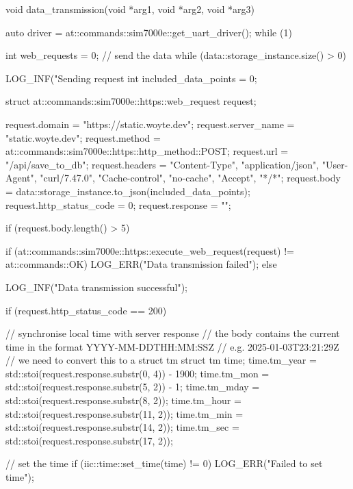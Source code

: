 \begin{cpp}[caption={Implementation of the data transmission thread}]
void data_transmission(void *arg1, void *arg2, void *arg3)
{
    auto driver = at::commands::sim7000e::get_uart_driver();
    while (1)
    {
        int web_requests = 0;
        // send the data
        while (data::storage_instance.size() > 0)
        {
            LOG_INF("Sending request %
            int included_data_points = 0;

            struct at::commands::sim7000e::https::web_request request;

            request.domain = "https://static.woyte.dev";
            request.server_name = "static.woyte.dev";
            request.method = at::commands::sim7000e::https::http_method::POST;
            request.url = "/api/save_to_db";
            request.headers = {{"Content-Type", "application/json"}, {"User-Agent", "curl/7.47.0"}, {"Cache-control", "no-cache"}, {"Accept", "*/*"}};
            request.body = data::storage_instance.to_json(included_data_points);
            request.http_status_code = 0;
            request.response = "";
            
            if (request.body.length() > 5)
            {
                if (at::commands::sim7000e::https::execute_web_request(request) != at::commands::OK)
                {
                    LOG_ERR("Data transmission failed");
                }
                else
                {
                    LOG_INF("Data transmission successful");

                    if (request.http_status_code == 200)
                    {
                        // synchronise local time with server response
                        // the body contains the current time in the format YYYY-MM-DDTHH:MM:SSZ
                        // e.g. 2025-01-03T23:21:29Z
                        // we need to convert this to a struct tm
                        struct tm time;
                        time.tm_year = std::stoi(request.response.substr(0, 4)) - 1900;
                        time.tm_mon = std::stoi(request.response.substr(5, 2)) - 1;
                        time.tm_mday = std::stoi(request.response.substr(8, 2));
                        time.tm_hour = std::stoi(request.response.substr(11, 2));
                        time.tm_min = std::stoi(request.response.substr(14, 2));
                        time.tm_sec = std::stoi(request.response.substr(17, 2));

                        // set the time
                        if (iic::time::set_time(time) != 0)
                        {
                            LOG_ERR("Failed to set time");
                        }

}}}}}}
\end{cpp}
